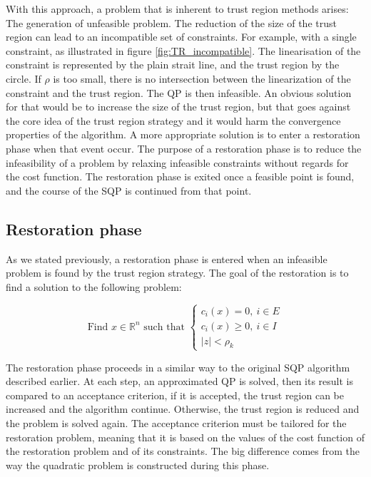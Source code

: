 With this approach, a problem that is inherent to trust region methods arises: The generation of unfeasible problem.
The reduction of the size of the trust region can lead to an incompatible set of constraints.
For example, with a single constraint, as illustrated in figure \ref{fig:TR_incompatible}.
The linearisation of the constraint is represented by the plain strait line, and the trust region by the circle.
If $\rho$ is too small, there is no intersection between the linearization of the constraint and the trust region.
The QP is then infeasible.
An obvious solution for that would be to increase the size of the trust region, but that goes against the core idea of the trust region strategy and it would harm the convergence properties of the algorithm.
A more appropriate solution is to enter a restoration phase when that event occur.
The purpose of a restoration phase is to reduce the infeasibility of a problem by relaxing infeasible constraints without regards for the cost function.
The restoration phase is exited once a feasible point is found, and the course of the SQP is continued from that point.

\subsection{Restoration phase}
\label{sub:restoration_phase}

As we stated previously, a restoration phase is entered when an infeasible problem is found by the trust region strategy.
The goal of the restoration is to find a solution to the following problem:

\begin{equation}
    \text{Find $x\in\mathbb{R}^n$ such that }
    \left\{
    \begin{array}{l}
      c_i(x)=0,\ i\in E \\
      c_i(x)\geq 0,\ i\in I\\
      |z|<\rho_k
    \end{array}
    \right.
  \label{eq:resto_NL}
\end{equation}

The restoration phase proceeds in a similar way to the original SQP algorithm described earlier.
At each step, an approximated QP is solved, then its result is compared to an acceptance criterion, if it is accepted, the trust region can be increased and the algorithm continue.
Otherwise, the trust region is reduced and the problem is solved again.
The acceptance criterion must be tailored for the restoration problem, meaning that it is based on the values of the cost function of the restoration problem and of its constraints.
The big difference comes from the way the quadratic problem is constructed during this phase.

